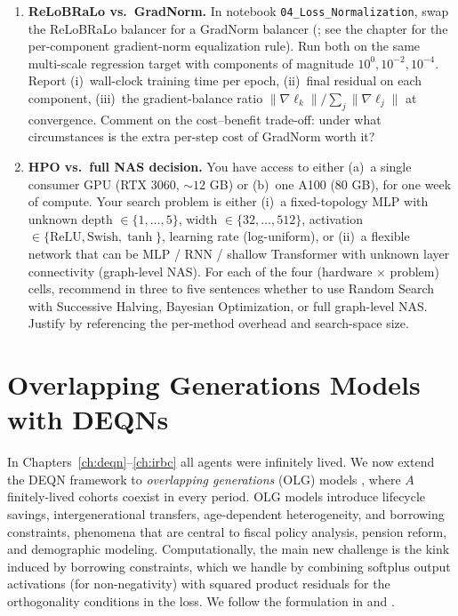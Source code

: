 \documentclass[11pt,a4paper]{report}
\begin{document}
\begin{enumerate}[itemsep=4pt, leftmargin=*]
\item\label{ex:ch4:6} \textbf{ReLoBRaLo vs.\ GradNorm.}  In notebook \texttt{04\_Loss\_Normalization}, swap the ReLoBRaLo balancer for a GradNorm balancer (\citealt{chen2018gradnorm}; see the chapter for the per-component gradient-norm equalization rule).  Run both on the same multi-scale regression target with components of magnitude $10^0, 10^{-2}, 10^{-4}$.  Report (i)~wall-clock training time per epoch, (ii)~final residual on each component, (iii)~the gradient-balance ratio $\|\nabla\ell_k\|/\sum_j \|\nabla\ell_j\|$ at convergence.  Comment on the cost--benefit trade-off: under what circumstances is the extra per-step cost of GradNorm worth it?
\item\label{ex:ch4:7} \textbf{HPO vs.\ full NAS decision.}  You have access to either (a)~a single consumer GPU (RTX 3060, $\sim 12$ GB) or (b)~one A100 ($80$ GB), for one week of compute.  Your search problem is either (i)~a fixed-topology MLP with unknown depth $\in \{1,\ldots,5\}$, width $\in \{32,\ldots,512\}$, activation $\in \{\mathrm{ReLU}, \mathrm{Swish}, \tanh\}$, learning rate (log-uniform), or (ii)~a flexible network that can be MLP / RNN / shallow Transformer with unknown layer connectivity (graph-level NAS).  For each of the four (hardware $\times$ problem) cells, recommend in three to five sentences whether to use Random Search with Successive Halving, Bayesian Optimization, or full graph-level NAS.  Justify by referencing the per-method overhead and search-space size.
\end{enumerate}


\chapter{Overlapping Generations Models with DEQNs}
\label{ch:olg}

In Chapters~\ref{ch:deqn}--\ref{ch:irbc} all agents were infinitely lived.  We now extend the DEQN framework to \emph{overlapping generations} (OLG) models \citep{diamond1965national}, where $A$ finitely-lived cohorts coexist in every period.  OLG models introduce lifecycle savings, intergenerational transfers, age-dependent heterogeneity, and borrowing constraints, phenomena that are central to fiscal policy analysis, pension reform, and demographic modeling.  Computationally, the main new challenge is the kink induced by borrowing constraints, which we handle by combining softplus output activations (for non-negativity) with squared product residuals for the orthogonality conditions in the loss.  We follow the formulation in \citet{Krueger20041411} and \citet{azinovicDEEPEQUILIBRIUMNETS2022}.
\end{document}
